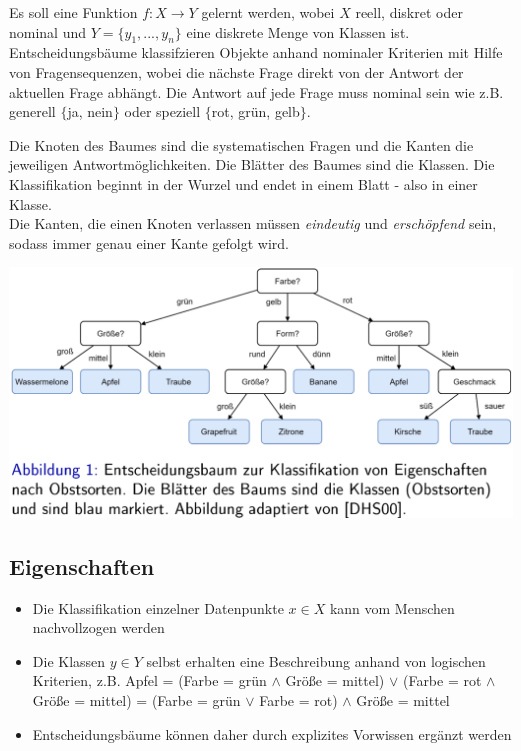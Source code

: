 \documentclass{report}
\begin{document}
  Es soll eine Funktion $f: X\rightarrow Y$ gelernt werden, wobei $X$ reell, diskret oder nominal und $Y = \{y_1, ..., y_n\}$	
  eine diskrete Menge von Klassen ist.\\	
  Entscheidungsbäume klassifzieren Objekte anhand nominaler Kriterien mit Hilfe von Fragensequenzen, wobei die nächste Frage	
  direkt von der Antwort der aktuellen Frage abhängt. Die Antwort auf jede Frage muss nominal sein wie z.B. generell $\{$ja, nein$\}$	
  oder speziell $\{$rot, grün, gelb$\}$.\par	
  Die Knoten des Baumes sind die systematischen Fragen und die Kanten die jeweiligen Antwortmöglichkeiten. Die Blätter des	
  Baumes sind die Klassen. Die Klassifikation beginnt in der Wurzel und endet in einem Blatt - also in einer Klasse.\\	
  Die Kanten, die einen Knoten verlassen müssen \textit{eindeutig} und \textit{erschöpfend} sein, sodass immer genau einer Kante	
  gefolgt wird.	
  
  \begin{center}	
    \includegraphics[scale=.285]{ml07_1}	
  \end{center}	
  
  \subsection{Eigenschaften}	
  
  \begin{itemize}	
    \item Die Klassifikation einzelner Datenpunkte $x\in X$ kann vom Menschen nachvollzogen werden	
    \item Die Klassen $y\in Y$ selbst erhalten eine Beschreibung anhand von logischen Kriterien, z.B.	
    \subitem Apfel = (Farbe = grün $\land$ Größe = mittel) $\lor$ (Farbe = rot $\land$ Größe = mittel)	
    = (Farbe = grün $\lor$ Farbe = rot) $\land$ Größe = mittel	
    \item Entscheidungsbäume können daher durch explizites Vorwissen ergänzt werden	
  \end{itemize}	
  
\end{document}
